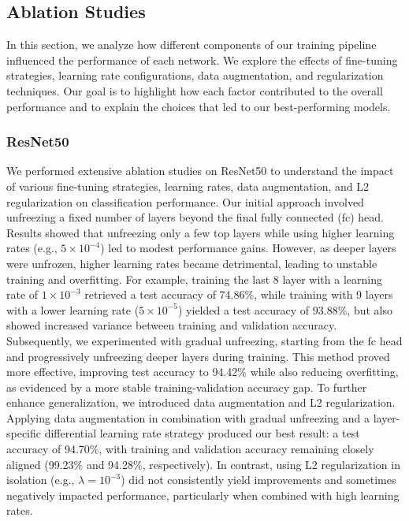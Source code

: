 \documentclass{article}
\begin{document}
\subsection{Ablation Studies}
In this section, we analyze how different components of our training pipeline influenced the performance of each network. We explore the effects of fine-tuning strategies, learning rate configurations, data augmentation, and regularization techniques. Our goal is to highlight how each factor contributed to the overall performance and to explain the choices that led to our best-performing models.

\subsubsection{ResNet50}
We performed extensive ablation studies on ResNet50 to understand the impact of various fine-tuning strategies, learning rates, data augmentation, and L2 regularization on classification performance. Our initial approach involved unfreezing a fixed number of layers beyond the final fully connected (fc) head. Results showed that unfreezing only a few top layers while using higher learning rates (e.g., $5 \times 10^{-4}$) led to modest performance gains. However, as deeper layers were unfrozen, higher learning rates became detrimental, leading to unstable training and overfitting. For example, training the last 8 layer with a learning rate of $1 \times 10^{-3}$ retrieved a test accuracy of 74.86\%, while training with 9 layers with a lower learning rate ($5 \times 10^{-5}$) yielded a test accuracy of 93.88\%, but also showed increased variance between training and validation accuracy. Subsequently, we experimented with gradual unfreezing, starting from the fc head and progressively unfreezing deeper layers during training. This method proved more effective, improving test accuracy to 94.42\% while also reducing overfitting, as evidenced by a more stable training-validation accuracy gap. To further enhance generalization, we introduced data augmentation and L2 regularization. Applying data augmentation in combination with gradual unfreezing and a layer-specific differential learning rate strategy produced our best result: a test accuracy of 94.70\%, with training and validation accuracy remaining closely aligned (99.23\% and 94.28\%, respectively). In contrast, using L2 regularization in isolation (e.g., $\lambda=10^{-3}$) did not consistently yield improvements and sometimes negatively impacted performance, particularly when combined with high learning rates.
\end{document}
